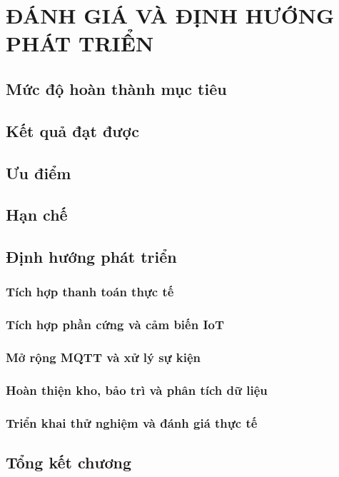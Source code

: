 \chapter{ĐÁNH GIÁ VÀ ĐỊNH HƯỚNG PHÁT TRIỂN}
\section{Mức độ hoàn thành mục tiêu}
\section{Kết quả đạt được}
\section{Ưu điểm}
\section{Hạn chế}
\section{Định hướng phát triển}
\subsection{Tích hợp thanh toán thực tế}
\subsection{Tích hợp phần cứng và cảm biến IoT}
\subsection{Mở rộng MQTT và xử lý sự kiện}
\subsection{Hoàn thiện kho, bảo trì và phân tích dữ liệu}
\subsection{Triển khai thử nghiệm và đánh giá thực tế}
\section{Tổng kết chương}
